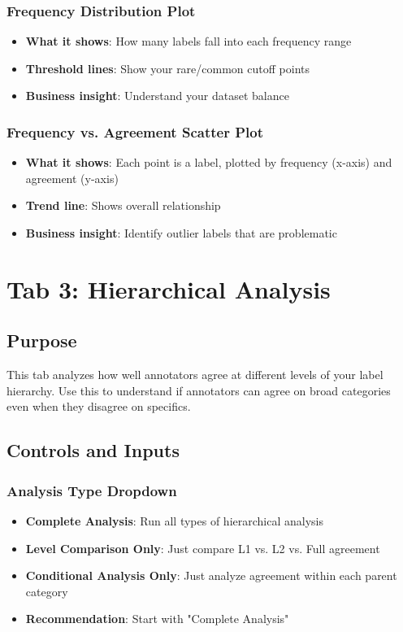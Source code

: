 \documentclass[11pt]{article}
\begin{document}
\subsubsection{Frequency Distribution Plot}
\begin{itemize}
\item \textbf{What it shows}: How many labels fall into each frequency range
\item \textbf{Threshold lines}: Show your rare/common cutoff points
\item \textbf{Business insight}: Understand your dataset balance
\end{itemize}

\subsubsection{Frequency vs. Agreement Scatter Plot}
\begin{itemize}
\item \textbf{What it shows}: Each point is a label, plotted by frequency (x-axis) and agreement (y-axis)
\item \textbf{Trend line}: Shows overall relationship
\item \textbf{Business insight}: Identify outlier labels that are problematic
\end{itemize}

\section{Tab 3: Hierarchical Analysis}

\subsection{Purpose}
This tab analyzes how well annotators agree at different levels of your label hierarchy. Use this to understand if annotators can agree on broad categories even when they disagree on specifics.

\subsection{Controls and Inputs}

\subsubsection{Analysis Type Dropdown}
\begin{itemize}
\item \textbf{Complete Analysis}: Run all types of hierarchical analysis
\item \textbf{Level Comparison Only}: Just compare L1 vs. L2 vs. Full agreement
\item \textbf{Conditional Analysis Only}: Just analyze agreement within each parent category
\item \textbf{Recommendation}: Start with "Complete Analysis"
\end{itemize}
\end{document}
